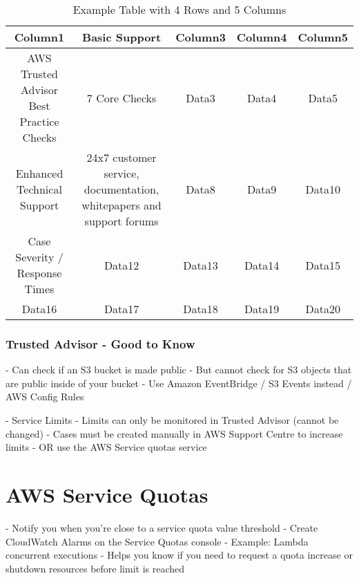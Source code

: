 \documentclass[11pt]{book}
\begin{document}
    \begin{table}[h!]
        \centering
        \begin{tabular}{|c|c|c|c|c|}
            \hline
            Column1                                  & Basic Support                                                        & Column3 & Column4 & Column5 \\ \hline
            AWS Trusted Advisor Best Practice Checks & 7 Core Checks                                                        & Data3   & Data4   & Data5   \\ \hline
            Enhanced Technical Support               & 24x7 customer service, documentation, whitepapers and support forums  & Data8   & Data9   & Data10  \\ \hline
            Case Severity / Response Times           & Data12                                                               & Data13  & Data14  & Data15  \\ \hline
            Data16                                   & Data17                                                               & Data18  & Data19  & Data20  \\ \hline
        \end{tabular}
        \caption{Example Table with 4 Rows and 5 Columns}
        \label{tab:example_table}
    \end{table}

    \subsubsection{Trusted Advisor - Good to Know}
    - Can check if an S3 bucket is made public
    - But cannot check for S3 objects that are public inside of your bucket
    - Use Amazon EventBridge / S3 Events instead / AWS Config Rules

    - Service Limits
    - Limits can only be monitored in Trusted Advisor (cannot be changed)
    - Cases must be created manually in AWS Support Centre to increase limits
    - OR use the AWS Service quotas service


    \section{AWS Service Quotas}
    - Notify you when you're close to a service quota value threshold
    - Create CloudWatch Alarms on the Service Quotas console
    - Example: Lambda concurrent executions
    - Helps you know if you need to request a quota increase or shutdown resources before limit is reached
\end{document}
